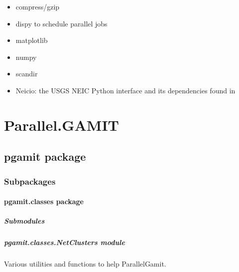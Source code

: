 \documentclass[letterpaper,10pt,english]{sphinxmanual}
\begin{document}
\begin{itemize}
\item {} 
\sphinxAtStartPar
compress/gzip

\item {} 
\sphinxAtStartPar
dispy to schedule parallel jobs

\item {} 
\sphinxAtStartPar
matplotlib

\item {} 
\sphinxAtStartPar
numpy

\item {} 
\sphinxAtStartPar
scandir

\item {} 
\sphinxAtStartPar
Neicio: the USGS NEIC Python interface and its dependencies found in 

\end{itemize}


\chapter{Parallel.GAMIT}
\label{\detokenize{index:parallel-gamit}}
\sphinxstepscope


\section{pgamit package}
\label{\detokenize{pgamit:pgamit-package}}\label{\detokenize{pgamit::doc}}

\subsection{Subpackages}
\label{\detokenize{pgamit:subpackages}}
\sphinxstepscope


\subsubsection{pgamit.classes package}
\label{\detokenize{pgamit.classes:pgamit-classes-package}}\label{\detokenize{pgamit.classes::doc}}

\paragraph{Submodules}
\label{\detokenize{pgamit.classes:submodules}}

\paragraph{pgamit.classes.NetClusters module}
\label{\detokenize{pgamit.classes:module-pgamit.classes.NetClusters}}\label{\detokenize{pgamit.classes:pgamit-classes-netclusters-module}}
\sphinxAtStartPar
Various utilities and functions to help ParallelGamit.
\end{document}
